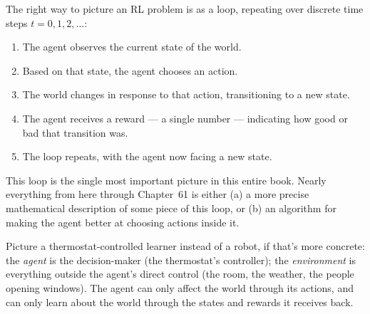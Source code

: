 The right way to picture an RL problem is as a loop, repeating over
discrete time steps $t = 0, 1, 2, \dots$:

\begin{enumerate}
  \item The agent observes the current state of the world.
  \item Based on that state, the agent chooses an action.
  \item The world changes in response to that action, transitioning to a
        new state.
  \item The agent receives a reward — a single number — indicating how
        good or bad that transition was.
  \item The loop repeats, with the agent now facing a new state.
\end{enumerate}

This loop is the single most important picture in this entire book.
Nearly everything from here through Chapter~61 is either (a) a more
precise mathematical description of some piece of this loop, or (b) an
algorithm for making the agent better at choosing actions inside it.

\begin{center}
\end{center}

\begin{intuitionbox}
Picture a thermostat-controlled learner instead of a robot, if that's more
concrete: the \emph{agent} is the decision-maker (the thermostat's
controller); the \emph{environment} is everything outside the
agent's direct control (the room, the weather, the people opening
windows). The agent can only affect the world through its actions, and
can only learn about the world through the states and rewards it
receives back.
\end{intuitionbox}

